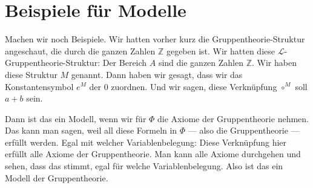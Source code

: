 \begin{math-stroke}
\end{math-stroke}

\section{Beispiele für Modelle}

\begin{spoken-clean}[01:20:07 - 01:22:55]
Machen wir noch Beispiele. Wir hatten vorher kurz die Gruppen\-theorie-\hspace{0pt}Struktur angeschaut, die durch die ganzen Zahlen $\mathbb{Z}$ gegeben ist. Wir hatten diese $\mathcal{L}$-\hspace{0pt}Gruppen\-theorie-\hspace{0pt}Struktur: Der Bereich $A$ sind die ganzen Zahlen $\mathbb{Z}$. Wir haben diese Struktur $M$ genannt. Dann haben wir gesagt, dass wir das Konstanten\-symbol $e^M$ der $0$ zuordnen. Und wir sagen, diese Verknüpfung $\circ^M$ soll $a + b$ sein.

Dann ist das ein Modell, wenn wir für $\Phi$ die Axiome der Gruppentheorie nehmen. Das kann man sagen, weil all diese Formeln in $\Phi$ --- also die Gruppentheorie --- erfüllt werden. Egal mit welcher Variablenbelegung: Diese Verknüpfung hier erfüllt alle Axiome der Gruppentheorie. Man kann alle Axiome durchgehen und sehen, dass das stimmt, egal für welche Variablenbelegung. Also ist das ein Modell der Gruppentheorie.
\end{spoken-clean}

